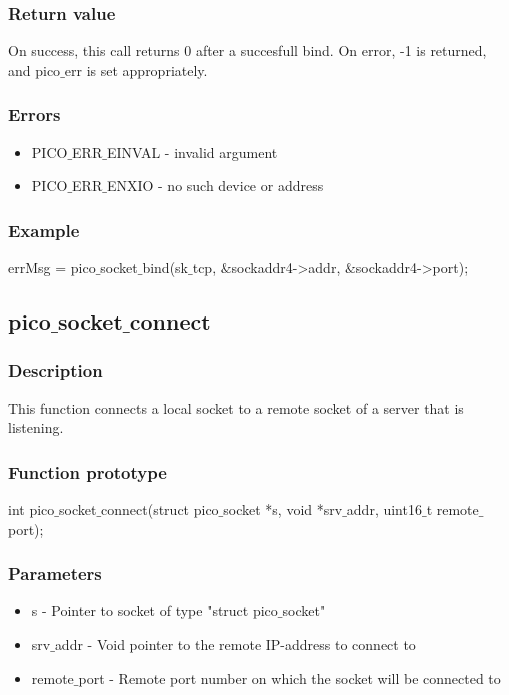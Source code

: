 \subsubsection*{Return value}
On success, this call returns 0 after a succesfull bind.
On error, -1 is returned, and pico$\_$err is set appropriately.

\subsubsection*{Errors}
\begin{itemize}
\item PICO$\_$ERR$\_$EINVAL - invalid argument
\item PICO$\_$ERR$\_$ENXIO - no such device or address
\end{itemize}

\subsubsection*{Example}
errMsg = pico$\_$socket$\_$bind(sk$\_$tcp, $\&$sockaddr4->addr, $\&$sockaddr4->port);


\subsection{pico$\_$socket$\_$connect}

\subsubsection*{Description}
This function connects a local socket to a remote socket of a server that is listening.

\subsubsection*{Function prototype}
int pico$\_$socket$\_$connect(struct pico$\_$socket *s, void *srv$\_$addr, uint16$\_$t remote$\_$port);

\subsubsection*{Parameters}
\begin{itemize}
\item s - Pointer to socket of type "struct pico$\_$socket"
\item srv$\_$addr - Void pointer to the remote IP-address to connect to
\item remote$\_$port - Remote port number on which the socket will be connected to
\end{itemize} 

